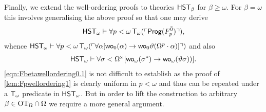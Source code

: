\documentclass[UKenglish,cleveref,DIV=12]{scrartcl}
\theoremstyle{definition}
\theoremstyle{definition}
\begin{document}
Finally, we extend the well-ordering proofs to theories $\mathsf{HST}_\beta$ for
$\beta\ge\omega$. For $\beta=\omega$ this involves generalising the above proof
so that one may derive
\begin{align}\label{eqn:Fbetawellordering0.1}
  \mathsf{HST}_\omega\vdash\forall p<\omega\,\mathsf{T}_\omega(\ulcorner{\mathsf{Prog}(F_p^{\bar0})}\urcorner),
\end{align}
whence $\mathsf{HST}_\omega \vdash\forall
p<\omega\,\mathsf{T}_\omega(\ulcorner{\forall\alpha[\mathsf{wo}_{0}(\alpha)\rightarrow\mathsf{wo}_{0}
\vartheta(\Omega^p\cdot\alpha)]}\urcorner)$ and also
\begin{align*}
  \mathsf{HST}_\omega\vdash \forall\sigma<\Omega^\omega[\mathsf{wo}_\omega(\sigma^*)\rightarrow
  \mathsf{wo}_\omega(\vartheta\sigma))].
\end{align*}
\eqref{eqn:Fbetawellordering0.1} is not difficult to establish as the proof of
\cref{lem:Fpwellordering1} is clearly uniform in $p<\omega$ and thus can be
repeated under a $\mathsf{T}_\omega$ predicate in $\mathsf{HST}_\omega$. But in order to lift the
construction to arbitrary $\beta\in\mathrm{OT}_\Omega\cap\Omega$ we require a more
general argument.
\end{document}
